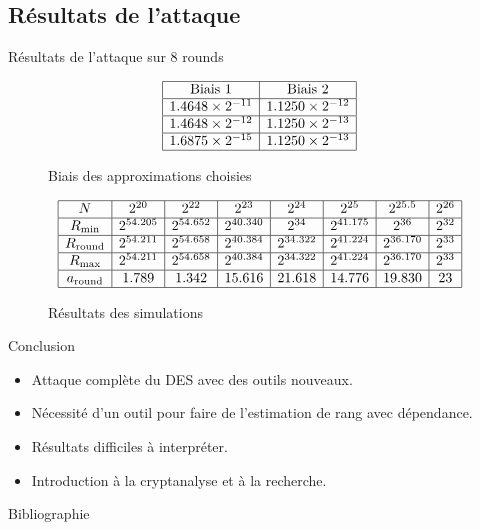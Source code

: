 \documentclass{beamer}
\begin{document}
\subsection{Résultats de l'attaque}
\begin{frame}{Résultats de l'attaque sur 8 rounds}

\begin{figure}
	\[
		\begin{array}{|c|c|}
			\hline
			\text{Biais 1} & \text{Biais 2}\\
			\hline
			1.4648 \times 2^{-11} & 1.1250\times 2^{-12}\\
			\hline
			1.4648 \times 2^{-12} & 1.1250\times 2^{-13} \\
			\hline
			1.6875 \times 2^{-15} & 1.1250\times 2^{-13}\\
			\hline
		\end{array}
	\]
	\caption{Biais des approximations choisies}
\end{figure}
	\vspace{-1cm}
\begin{figure}
\[
	\begin{array}{|c|c|c|c|c|c|c|c|}
		\hline
		N & 2^{20} & 2^{22} & 2^{23} & 2^{24} & 2^{25} & 2^{25.5} & 2^{26}\\
		\hline
		R_{\text{min}} & 2^{54.205} & 2^{54.652} & 2^{40.340} & 2^{34} & 2^{41.175} & 2^{36} & 2^{32}\\
		\hline
		R_{\text{round}} & 2^{54.211} & 2^{54.658} & 2^{40.384} & 2^{34.322} & 2^{41.224} & 2^{36.170} & 2^{33}\\
		\hline
		R_{\text{max}} & 2^{54.211} & 2^{54.658} & 2^{40.384} & 2^{34.322} & 2^{41.224} & 2^{36.170} & 2^{33}\\
		\hline
		a_{\text{round}} & 1.789 & 1.342 & 15.616 & 21.618 & 14.776 & 19.830 & 23\\
		\hline
	\end{array}
\]
	\caption{Résultats des simulations}
\end{figure}

\end{frame}


\begin{frame}{Conclusion}
	\begin{itemize}
		\item Attaque complète du DES avec des outils nouveaux.
		\item Nécessité d'un outil pour faire de l'estimation de rang avec dépendance.
		\item Résultats difficiles à interpréter.
		\item Introduction à la cryptanalyse et à la recherche.
	\end{itemize}
\end{frame}

\begin{frame}{Bibliographie}
\nocite{*}


\end{frame}
\end{document}
